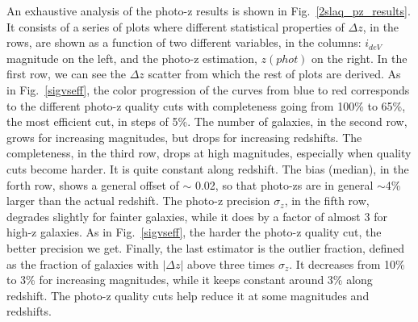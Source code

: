 An exhaustive analysis of the photo-z results is shown in Fig.~\ref{2slaq_pz_results}. It consists of a series of plots where different statistical properties of $\Delta z$, in the rows, are shown as a function of two different variables, in the columns: $i_{deV}$ magnitude on the left, and the photo-z estimation, $z(phot)$ on the right. In the first row, we can see the $\Delta z$ scatter from which the rest of plots are derived. As in Fig.~\ref{sigvseff}, the color progression of the curves from blue to red corresponds to the different photo-z quality cuts with completeness going from 100\% to 65\%, the most efficient cut, in steps of 5\%. The number of galaxies, in the second row, grows for increasing magnitudes, but drops for increasing redshifts. The completeness, in the third row, drops at high magnitudes,
especially when quality cuts become harder. It is quite constant along redshift. The bias (median), in the forth row, shows a general offset of $\sim$ 0.02, so that photo-zs are in general $\sim$4\% larger than the actual redshift. The photo-z precision $\sigma_z$, in the fifth row, degrades slightly for fainter galaxies, while it does by a factor of almost 3 for high-z galaxies. As in Fig.~\ref{sigvseff}, the harder the photo-z quality cut, the better precision we get. Finally, the last estimator is the outlier fraction, defined as the fraction of galaxies with $|\Delta z|$ above three times $\sigma_z$. It decreases from 10\% to 3\% for increasing magnitudes, while it keeps constant around 3\% along redshift. The photo-z quality cuts help reduce it at some magnitudes and redshifts. 
